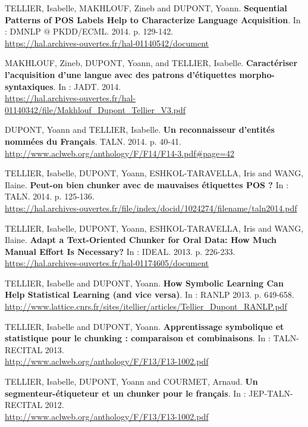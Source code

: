 \documentclass[12pt,a4paper,times,twoside,openright]{report}
\begin{document}
    TELLIER, Isabelle, MAKHLOUF, Zineb and DUPONT, Yoann. \textbf{Sequential Patterns of POS Labels Help to Characterize Language Acquisition}. In : DMNLP $@$ PKDD/ECML. 2014. p. 129-142.\\
    \url{https://hal.archives-ouvertes.fr/hal-01140542/document}
    
    MAKHLOUF, Zineb, DUPONT, Yoann, and TELLIER, Isabelle. \textbf{Caractériser l'acquisition d'une langue avec des patrons d'étiquettes morpho-syntaxiques}. In : JADT. 2014.\\
    \url{https://hal.archives-ouvertes.fr/hal-01140342/file/Makhlouf_Dupont_Tellier_V3.pdf}
    
    DUPONT, Yoann and TELLIER, Isabelle. \textbf{Un reconnaisseur d'entités nommées du Français}. TALN. 2014. p. 40-41.\\
    \url{http://www.aclweb.org/anthology/F/F14/F14-3.pdf#page=42}
    
    TELLIER, Isabelle, DUPONT, Yoann, ESHKOL-TARAVELLA, Iris and WANG, Ilaine. \textbf{Peut-on bien chunker avec de mauvaises étiquettes POS ?} In : TALN. 2014. p. 125-136.\\
    \url{https://hal.archives-ouvertes.fr/file/index/docid/1024274/filename/taln2014.pdf}
    
    TELLIER, Isabelle, DUPONT, Yoann, ESHKOL-TARAVELLA, Iris and WANG, Ilaine. \textbf{Adapt a Text-Oriented Chunker for Oral Data: How Much Manual Effort Is Necessary?} In : IDEAL. 2013. p. 226-233.\\
    \url{https://hal.archives-ouvertes.fr/hal-01174605/document}
    
    TELLIER, Isabelle and DUPONT, Yoann. \textbf{How Symbolic Learning Can Help Statistical Learning (and vice versa)}. In : RANLP 2013. p. 649-658.\\
    \url{http://www.lattice.cnrs.fr/sites/itellier/articles/Tellier_Dupont_RANLP.pdf}
    
    TELLIER, Isabelle and DUPONT, Yoann. \textbf{Apprentissage symbolique et statistique pour le chunking : comparaison et combinaisons}. In : TALN-RECITAL 2013.\\
    \url{http://www.aclweb.org/anthology/F/F13/F13-1002.pdf}
    
    TELLIER, Isabelle, DUPONT, Yoann and COURMET, Arnaud. \textbf{Un segmenteur-étiqueteur et un chunker pour le français}. In : JEP-TALN-RECITAL 2012.\\
    \url{http://www.aclweb.org/anthology/F/F13/F13-1002.pdf}
    
\end{document}
